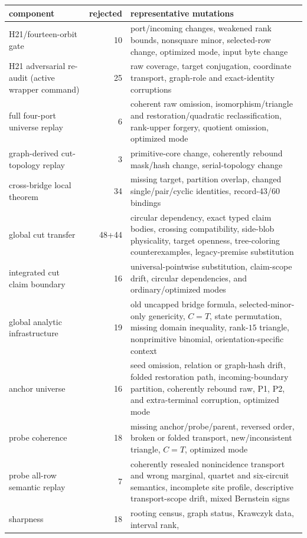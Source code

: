 \documentclass[10pt]{article}
\begin{document}
\begin{longtable}{L{.27\linewidth}rL{.58\linewidth}}
\toprule
component & rejected & representative mutations\\
\midrule
\endhead
H21/fourteen-orbit gate & 10 & port/incoming changes, weakened rank bounds,
nonsquare minor, selected-row change, optimized mode, input byte change\\
H21 adversarial re-audit (active wrapper command) & 25 & raw coverage, target conjugation,
coordinate transport, graph-role and exact-identity corruptions\\
full four-port universe replay & 6 & coherent raw omission, isomorphism/triangle
and restoration/quadratic reclassification, rank-upper forgery, quotient
omission, optimized mode\\
graph-derived cut-topology replay & 3 & primitive-core change, coherently
rebound mask/hash change, serial-topology change\\
cross-bridge local theorem & 34 & missing target, partition overlap,
changed single/pair/cyclic identities, record-43/60 bindings\\
global cut transfer & 48+44 & circular dependency, exact typed claim bodies,
crossing compatibility,
side-blob physicality, target openness, tree-coloring counterexamples,
legacy-premise substitution\\
integrated cut claim boundary & 16 & universal-pointwise substitution,
claim-scope drift, circular dependencies, and ordinary/optimized modes\\
global analytic infrastructure & 19 & old uncapped bridge formula,
selected-minor-only genericity, \(C=T\), state permutation, missing domain
inequality, rank-\(15\) triangle, nonprimitive binomial, orientation-specific
context\\
anchor universe & 16 & seed omission, relation or graph-hash drift, folded
restoration path, incoming-boundary partition, coherently rebound raw, P1,
P2, and extra-terminal corruption, optimized mode\\
probe coherence & 18 & missing anchor/probe/parent, reversed order,
broken or folded transport, new/inconsistent triangle, \(C=T\), optimized mode\\
probe all-row semantic replay & 7 & coherently resealed nonincidence
transport and wrong marginal, quartet and six-circuit semantics, incomplete
site profile, descriptive transport-scope drift, mixed Bernstein signs\\
sharpness & 18 & rooting census, graph status, Krawczyk data, interval rank,

\end{longtable}
\end{document}
